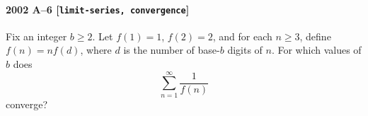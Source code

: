 \paragraph{2002 A--6 \textnormal{[\texttt{limit-series, convergence}]}}
Fix an integer $b \geq 2$. Let $f(1) = 1$, $f(2) = 2$, and for each
$n \geq 3$, define $f(n) = n f(d)$, where $d$ is the number of
base-$b$ digits of $n$. For which values of $b$ does
\[
\sum_{n=1}^\infty \frac{1}{f(n)}
\]
converge?
